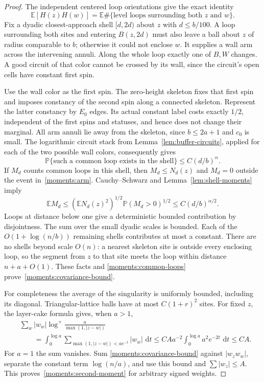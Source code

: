 \documentclass[11pt]{article}
\theoremstyle{definition}
\theoremstyle{remark}
\numberwithin{equation}{section}
\begin{document}
\begin{proof}
The independent centered loop orientations give the exact identity
\begin{equation}\label{moments:common-loops}
 \mathbb E[H(z)H(w)]
 =\mathbb E\#\{\text{level loops surrounding both $z$ and $w$}\}.
\end{equation}
Fix a dyadic closest-approach shell $[d,2d)$ about $z$ with
$d\leq b/100$.  A loop surrounding both sites and entering $B(z,2d)$
must also leave a ball about $z$ of radius comparable to $b$; otherwise
it could not enclose $w$.  It supplies a wall arm across the intervening
annuli.  Along the whole loop exactly one of $B,W$ changes.  A good
circuit of that color cannot be crossed by its wall, since the circuit's
open cells have constant first spin.

Use the wall color as the first spin.  The zero-height skeleton fixes
that first spin and imposes constancy of the second spin along a
connected skeleton.  Represent the latter constancy by $E_0$ edges.
Its actual constant label costs exactly $1/2$, independent of the
first spins and statuses, and hence does not change their marginal.
All arm annuli lie away from the skeleton, since $b\leq2a+1$ and
$c_0$ is small.  The logarithmic circuit stack from
Lemma~\ref{lem:buffer-circuits}, applied for each of the two possible
wall colors, consequently gives
\begin{equation}\label{moments:arm}
 \mathbb P\{\text{such a common loop exists in the shell}\}
 \leq C(d/b)^\alpha.
\end{equation}
If $M_d$ counts common loops in this shell, then
$M_d\leq N_d(z)$ and $M_d=0$ outside the event in~\eqref{moments:arm}.
Cauchy--Schwarz and Lemma~\ref{lem:shell-moments} imply
\[
 \mathbb E M_d\leq (\mathbb E N_d(z)^2)^{1/2}
       \mathbb P(M_d>0)^{1/2}
 \leq C(d/b)^{\alpha/2}.
\]
Loops at distance below one give a deterministic bounded contribution
by disjointness.  The sum over the small dyadic scales is bounded.
Each of the
$O(1+\log(n/b))$ remaining shells contributes at most a constant.
There are no shells beyond scale $O(n)$: a nearest skeleton site is
outside every enclosing loop, so the segment from $z$ to that site
meets the loop within distance $n+a+O(1)$.  These facts and
\eqref{moments:common-loops} prove~\eqref{moments:covariance-bound}.

For completeness the average of the singularity is uniformly bounded,
including its diagonal.  Triangular-lattice balls have at most
$C(1+r)^2$ sites.  For fixed $z$, the layer-cake formula gives, when
$a>1$,
\begin{align*}
 &\sum_w |w_w|\log^+\frac{a}{\max(1,|z-w|)}\\
 &\qquad=\int_0^{\log a}
      \sum_{\max(1,|z-w|)<ae^{-t}}|w_w|\,\,\mathrm d t
 \leq C A a^{-2}\int_0^{\log a}a^2e^{-2t}\,\,\mathrm d t
 \leq C A.
\end{align*}
For $a=1$ the sum vanishes.  Sum
\eqref{moments:covariance-bound} against $|w_zw_w|$, separate the
constant term $\log(n/a)$, and use this bound and
$\sum|w_z|\leq A$.  This proves~\eqref{moments:second-moment}
for arbitrary signed weights.
\end{proof}
\end{document}
